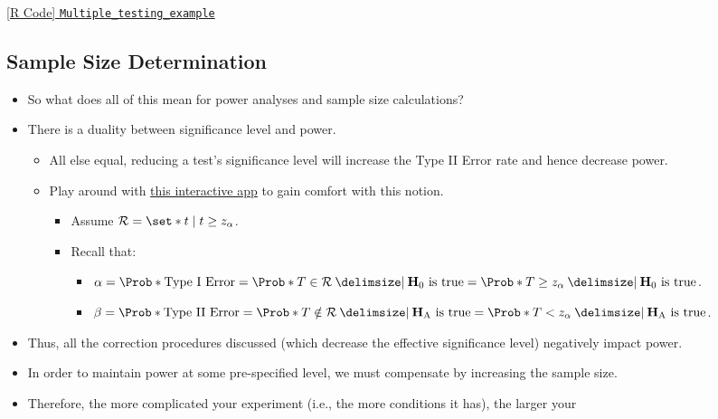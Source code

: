 \href{https://github.com/Hextical/university-notes/blob/master/year-3/semester-3/STAT 430/code/Multiple_testing_example.R}{[R Code] \texttt{Multiple\_testing\_example}}
\subsection{Sample Size Determination}
\begin{itemize}
      \item So what does all of this mean for power analyses and sample size calculations?
      \item There is a duality between significance level and power.
            \begin{itemize}
                  \item All else equal, reducing a test's significance level will increase the Type II Error rate and hence
                        decrease power.
                  \item Play around with \href{https://nathaniel-t-stevens.shinyapps.io/ErrorIllustrator/}{this interactive app} to gain comfort with this notion.
                        \begin{itemize}
                              \item Assume $ \mathcal{R}=\set*{t\mid t\ge z_\alpha} $.
                              \item Recall that: \begin{itemize}
                                          \item $ \alpha=\Prob*{\text{Type I Error}}=\Prob*{T\in\mathcal{R}\given \text{$ \mathbf{H}_0 $ is true}}=\Prob*{T\ge z_\alpha\given \text{$ \mathbf{H}_0 $ is true}}$.
                                          \item $ \beta=\Prob*{\text{Type II Error}}=\Prob*{T\notin\mathcal{R}\given \text{$ \mathbf{H}_\text{A} $ is true}}=\Prob*{T< z_\alpha\given \text{$ \mathbf{H}_\text{A} $ is true}} $.
                                    \end{itemize}
                        \end{itemize}
            \end{itemize}
      \item Thus, all the correction procedures discussed (which decrease the effective significance level)
            negatively impact power.
      \item In order to maintain power at some pre-specified level, we must compensate by increasing the sample
            size.
      \item Therefore, the more complicated your experiment (i.e., the more conditions it has), the larger your

\end{itemize}
